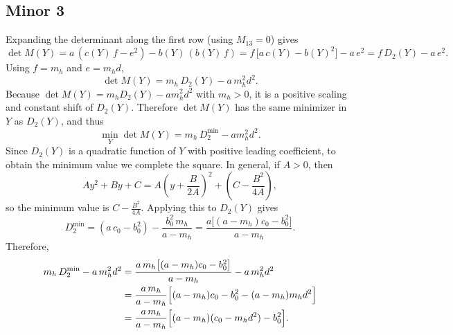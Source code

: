 \documentclass[11pt]{article}
\begin{document}
\subsection{Minor 3}
Expanding the determinant along the first row (using \(M_{13}=0\)) gives
\begin{equation}
    \det M(Y) = a\,(c(Y)\,f - e^2) - b(Y)\,(b(Y)\,f)
              = f\,\bigl[a\,c(Y) - b(Y)^2\bigr] - a\,e^2
              = f\,D_2(Y) - a\,e^2.
\end{equation}
Using \(f=m_h\) and \(e=m_h d\),
\begin{equation}
    \det M(Y) = m_h\,D_2(Y) - a\,m_h^2 d^2.
\end{equation}
Because \(\det M(Y)=m_h D_2(Y)-a m_h^2 d^2\) with \(m_h>0\), it is a positive scaling and constant shift of \(D_2(Y)\). Therefore \(\det M(Y)\) has the same minimizer in \(Y\) as \(D_2(Y)\), and thus
\begin{equation}
    \min_Y \det M(Y)=m_h\,D_2^{\min}-a m_h^2 d^2.
\end{equation}
Since \(D_2(Y)\) is a quadratic function of \(Y\) with positive leading coefficient, to obtain the minimum value we complete the square. In general, if \(A>0\), then
\[
Ay^2+By+C
=
A\left(y+\frac{B}{2A}\right)^2
+
\left(C-\frac{B^2}{4A}\right),
\]
so the minimum value is \(C-\frac{B^2}{4A}\). Applying this to \(D_2(Y)\) gives
\begin{equation}
    D_2^{\min}
    = (a\,c_0 - b_0^2) - \frac{b_0^2\,m_h}{a-m_h}
    = \frac{a\bigl[(a-m_h)c_0 - b_0^2\bigr]}{a-m_h}.
\end{equation}
Therefore,
\begin{align}
    m_h\,D_2^{\min} - a\,m_h^2 d^2
    &= \frac{a\,m_h\bigl[(a-m_h)c_0 - b_0^2\bigr]}{a-m_h} - a\,m_h^2 d^2 \notag\\
    &= \frac{a\,m_h}{a-m_h}\Bigl[(a-m_h)c_0 - b_0^2 - (a-m_h)m_h d^2\Bigr] \notag\\
    &= \frac{a\,m_h}{a-m_h}\Bigl[(a-m_h)(c_0 - m_h d^2) - b_0^2\Bigr].
\end{align}
\end{document}
